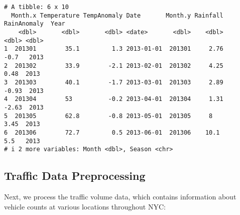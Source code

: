 \documentclass[
  letterpaper,
  DIV=11,
  numbers=noendperiod]{scrreprt}
\begin{document}
\begin{verbatim}
# A tibble: 6 x 10
  Month.x Temperature TempAnomaly Date       Month.y Rainfall RainAnomaly  Year
    <dbl>       <dbl>       <dbl> <date>       <dbl>    <dbl>       <dbl> <dbl>
1  201301        35.1         1.3 2013-01-01  201301     2.76       -0.7   2013
2  201302        33.9        -2.1 2013-02-01  201302     4.25        0.48  2013
3  201303        40.1        -1.7 2013-03-01  201303     2.89       -0.93  2013
4  201304        53          -0.2 2013-04-01  201304     1.31       -2.63  2013
5  201305        62.8        -0.8 2013-05-01  201305     8           3.45  2013
6  201306        72.7         0.5 2013-06-01  201306    10.1         5.5   2013
# i 2 more variables: Month <dbl>, Season <chr>
\end{verbatim}

\subsection{Traffic Data
Preprocessing}\label{traffic-data-preprocessing}

Next, we process the traffic volume data, which contains information
about vehicle counts at various locations throughout NYC:
\end{document}
